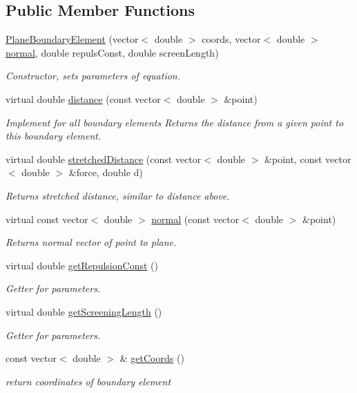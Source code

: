 \subsection*{Public Member Functions}
\begin{DoxyCompactItemize}
\item 
\hyperlink{classPlaneBoundaryElement_a27539f30d1a91ba71e7b121d03d98bf3}{Plane\+Boundary\+Element} (vector$<$ double $>$ coords, vector$<$ double $>$ \hyperlink{classPlaneBoundaryElement_a0d87ae7390cd7fcfa2c7769e6212ee97}{normal}, double repuls\+Const, double screen\+Length)
\begin{DoxyCompactList}\small\item\em Constructor, sets parameters of equation. \end{DoxyCompactList}\item 
virtual double \hyperlink{classPlaneBoundaryElement_ad35d384337c44f4bf5e5b243cf9cda88}{distance} (const vector$<$ double $>$ \&point)
\begin{DoxyCompactList}\small\item\em Implement for all boundary elements Returns the distance from a given point to this boundary element. \end{DoxyCompactList}\item 
virtual double \hyperlink{classPlaneBoundaryElement_a7855fefca7c75e466abf4ae9d6883fb2}{stretched\+Distance} (const vector$<$ double $>$ \&point, const vector$<$ double $>$ \&force, double d)
\begin{DoxyCompactList}\small\item\em Returns stretched distance, similar to distance above. \end{DoxyCompactList}\item 
virtual const vector$<$ double $>$ \hyperlink{classPlaneBoundaryElement_a0d87ae7390cd7fcfa2c7769e6212ee97}{normal} (const vector$<$ double $>$ \&point)
\begin{DoxyCompactList}\small\item\em Returns normal vector of point to plane. \end{DoxyCompactList}\item 
virtual double \hyperlink{classPlaneBoundaryElement_a022862630bad9bf77b6de4057474876a}{get\+Repulsion\+Const} ()
\begin{DoxyCompactList}\small\item\em Getter for parameters. \end{DoxyCompactList}\item 
virtual double \hyperlink{classPlaneBoundaryElement_a81c5691717216f8602cc2300c603e253}{get\+Screening\+Length} ()
\begin{DoxyCompactList}\small\item\em Getter for parameters. \end{DoxyCompactList}\item 
const vector$<$ double $>$ \& \hyperlink{classBoundaryElement_ace76817d750bb44c11edd918f1a8b78f}{get\+Coords} ()
\begin{DoxyCompactList}\small\item\em return coordinates of boundary element \end{DoxyCompactList}\end{DoxyCompactItemize}
